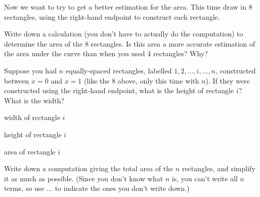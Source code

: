 \documentclass[11pt,fleqn]{article}
\begin{document}
\begin{adjustbox}{valign=t,minipage={.45\textwidth}}

\item Now we want to try to get a better estimation for the area. This time draw in 8 rectangles, using the {\sc right-hand endpoint} to construct each rectangle.

\end{adjustbox}
\begin{adjustbox}{valign=t,minipage={.45\textwidth}}
\begin{center}
\end{center}
\end{adjustbox}

Write down a calculation (you don't have to actually do the computation) to determine the area of the 8 rectangles. Is this area a more accurate estimation of the area under the curve than when you used 4 rectangles? Why?
\vfill

\item Suppose you had $n$ equally-spaced rectangles, labelled $1, 2, \ldots, i, \ldots, n$, constructed between $x = 0$ and $x = 1$ (like the 8 above, only this time with $n$).  If they were constructed using the right-hand endpoint, what is the height of rectangle $i$? What is the width?
\bigskip

width of rectangle $i$ \hrulefill



\bigskip

height of rectangle $i$ \hrulefill

\bigskip


area of rectangle $i$ \hrulefill

\bigskip

Write down a computation giving the total area of the $n$ rectangles, and simplify it as much as possible. (Since you don't know what $n$ is, you can't write all $n$ terms, so use $\ldots$ to indicate the ones you don't write down.)
\vfill
\vfill
\end{document}
